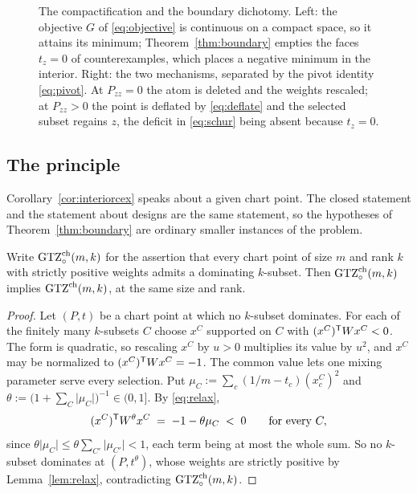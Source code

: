 \begin{figure}[ht]
  \centering
  
  \caption{The compactification and the boundary dichotomy.  Left: the
  objective $G$ of \eqref{eq:objective} is continuous on a compact space,
  so it attains its minimum; Theorem~\ref{thm:boundary} empties the
  faces $t_z=0$ of counterexamples, which places a negative minimum in
  the interior.  Right: the two mechanisms, separated by the pivot
  identity \eqref{eq:pivot}.  At $P_{zz}=0$ the atom is deleted and the
  weights rescaled; at $P_{zz}>0$ the point is deflated by
  \eqref{eq:deflate} and the selected subset regains $z$, the deficit in
  \eqref{eq:schur} being absent because $t_z=0$.}
  \label{fig:boundary}
\end{figure}

\subsection{The principle}\label{sec:variational}

Corollary~\ref{cor:interiorcex} speaks about a given chart point.  The
closed statement and the statement about designs are the same statement,
so the hypotheses of Theorem~\ref{thm:boundary} are ordinary smaller
instances of the problem.

\begin{proposition}[Lean]\label{prop:density}
Write $\mathrm{GTZ}^{\mathrm{ch}}_{\circ}(m,k)$ for the assertion that every
chart point of size $m$ and rank $k$ with strictly positive weights
admits a dominating $k$-subset.  Then
$\mathrm{GTZ}^{\mathrm{ch}}_{\circ}(m,k)$ implies $\mathrm{GTZ}^{\mathrm{ch}}(m,k)$, at
the same size and rank.
\end{proposition}

\begin{proof}
Let $(P,t)$ be a chart point at which no $k$-subset dominates.  For each
of the finitely many $k$-subsets $C$ choose $x^{C}$ supported on $C$ with
$(x^{C})^{\mathsf{T}} Wx^{C}<0$.  The form is quadratic, so rescaling $x^{C}$ by
$u>0$ multiplies its value by $u^{2}$, and $x^{C}$ may be normalized to
$(x^{C})^{\mathsf{T}} Wx^{C}=-1$.  The common value lets one mixing parameter
serve every selection.  Put
$\mu_C:=\sum_c(1/m-t_c)(x^{C}_c)^{2}$ and
$\theta:=\bigl(1+\sum_C\lvert\mu_C\rvert\bigr)^{-1}\in(0,1]$.  By
\eqref{eq:relax},
\[
  (x^{C})^{\mathsf{T}} W^{\theta}x^{C}\;=\;-1-\theta\mu_C\;<\;0
  \qquad\text{for every }C,
\]
since
$\theta\lvert\mu_C\rvert\le\theta\sum_{C'}\lvert\mu_{C'}\rvert<1$, each
term being at most the whole sum.  So no $k$-subset dominates at
$(P,t^{\theta})$, whose weights are strictly positive by
Lemma~\ref{lem:relax}, contradicting
$\mathrm{GTZ}^{\mathrm{ch}}_{\circ}(m,k)$.
\end{proof}

